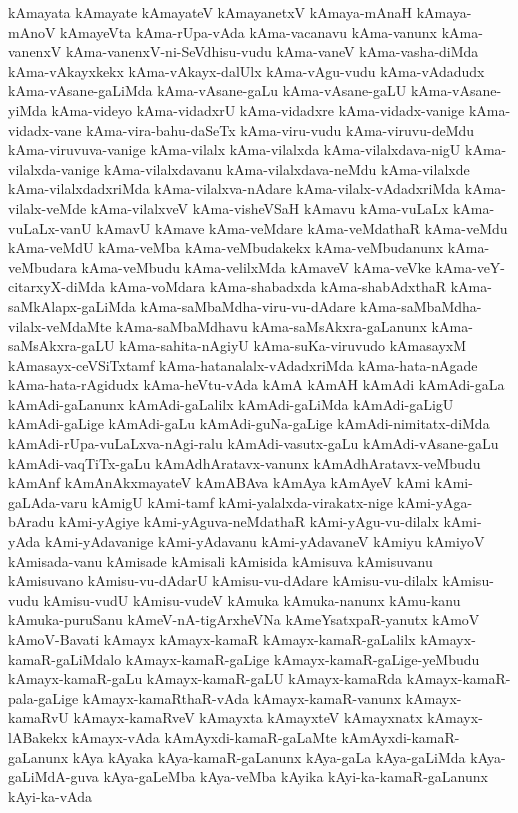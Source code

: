 {kAmayata
kAmayate
kAmayateV
kAmayanetxV
kAmaya-mAnaH
kAmaya-mAnoV
kAmayeVta
kAma-rUpa-vAda
kAma-vacanavu
kAma-vanunx
kAma-vanenxV
kAma-vanenxV-ni-SeVdhisu-vudu
kAma-vaneV
kAma-vasha-diMda
kAma-vAkayxkekx
kAma-vAkayx-dalUlx
kAma-vAgu-vudu
kAma-vAdadudx
kAma-vAsane-gaLiMda
kAma-vAsane-gaLu
kAma-vAsane-gaLU
kAma-vAsane-yiMda
kAma-videyo
kAma-vidadxrU
kAma-vidadxre
kAma-vidadx-vanige
kAma-vidadx-vane
kAma-vira-bahu-daSeTx
kAma-viru-vudu
kAma-viruvu-deMdu
kAma-viruvuva-vanige
kAma-vilalx
kAma-vilalxda
kAma-vilalxdava-nigU
kAma-vilalxda-vanige
kAma-vilalxdavanu
kAma-vilalxdava-neMdu
kAma-vilalxde
kAma-vilalxdadxriMda
kAma-vilalxva-nAdare
kAma-vilalx-vAdadxriMda
kAma-vilalx-veMde
kAma-vilalxveV
kAma-visheVSaH
kAmavu
kAma-vuLaLx
kAma-vuLaLx-vanU
kAmavU
kAmave
kAma-veMdare
kAma-veMdathaR
kAma-veMdu
kAma-veMdU
kAma-veMba
kAma-veMbudakekx
kAma-veMbudanunx
kAma-veMbudara
kAma-veMbudu
kAma-velilxMda
kAmaveV
kAma-veVke
kAma-veY-citarxyX-diMda
kAma-voMdara
kAma-shabadxda
kAma-shabAdxthaR
kAma-saMkAlapx-gaLiMda
kAma-saMbaMdha-viru-vu-dAdare
kAma-saMbaMdha-vilalx-veMdaMte
kAma-saMbaMdhavu
kAma-saMsAkxra-gaLanunx
kAma-saMsAkxra-gaLU
kAma-sahita-nAgiyU
kAma-suKa-viruvudo
kAmasayxM
kAmasayx-ceVSiTxtamf
kAma-hatanalalx-vAdadxriMda
kAma-hata-nAgade
kAma-hata-rAgidudx
kAma-heVtu-vAda
kAmA
kAmAH
kAmAdi
kAmAdi-gaLa
kAmAdi-gaLanunx
kAmAdi-gaLalilx
kAmAdi-gaLiMda
kAmAdi-gaLigU
kAmAdi-gaLige
kAmAdi-gaLu
kAmAdi-guNa-gaLige
kAmAdi-nimitatx-diMda
kAmAdi-rUpa-vuLaLxva-nAgi-ralu
kAmAdi-vasutx-gaLu
kAmAdi-vAsane-gaLu
kAmAdi-vaqTiTx-gaLu
kAmAdhAratavx-vanunx
kAmAdhAratavx-veMbudu
kAmAnf
kAmAnAkxmayateV
kAmABAva
kAmAya
kAmAyeV
kAmi
kAmi-gaLAda-varu
kAmigU
kAmi-tamf
kAmi-yalalxda-virakatx-nige
kAmi-yAga-bAradu
kAmi-yAgiye
kAmi-yAguva-neMdathaR
kAmi-yAgu-vu-dilalx
kAmi-yAda
kAmi-yAdavanige
kAmi-yAdavanu
kAmi-yAdavaneV
kAmiyu
kAmiyoV
kAmisada-vanu
kAmisade
kAmisali
kAmisida
kAmisuva
kAmisuvanu
kAmisuvano
kAmisu-vu-dAdarU
kAmisu-vu-dAdare
kAmisu-vu-dilalx
kAmisu-vudu
kAmisu-vudU
kAmisu-vudeV
kAmuka
kAmuka-nanunx
kAmu-kanu
kAmuka-puruSanu
kAmeV-nA-tigArxheVNa
kAmeYsatxpaR-yanutx
kAmoV
kAmoV-Bavati
kAmayx
kAmayx-kamaR
kAmayx-kamaR-gaLalilx
kAmayx-kamaR-gaLiMdalo
kAmayx-kamaR-gaLige
kAmayx-kamaR-gaLige-yeMbudu
kAmayx-kamaR-gaLu
kAmayx-kamaR-gaLU
kAmayx-kamaRda
kAmayx-kamaR-pala-gaLige
kAmayx-kamaRthaR-vAda
kAmayx-kamaR-vanunx
kAmayx-kamaRvU
kAmayx-kamaRveV
kAmayxta
kAmayxteV
kAmayxnatx
kAmayx-lABakekx
kAmayx-vAda
kAmAyxdi-kamaR-gaLaMte
kAmAyxdi-kamaR-gaLanunx
kAya
kAyaka
kAya-kamaR-gaLanunx
kAya-gaLa
kAya-gaLiMda
kAya-gaLiMdA-guva
kAya-gaLeMba
kAya-veMba
kAyika
kAyi-ka-kamaR-gaLanunx
kAyi-ka-vAda
}
